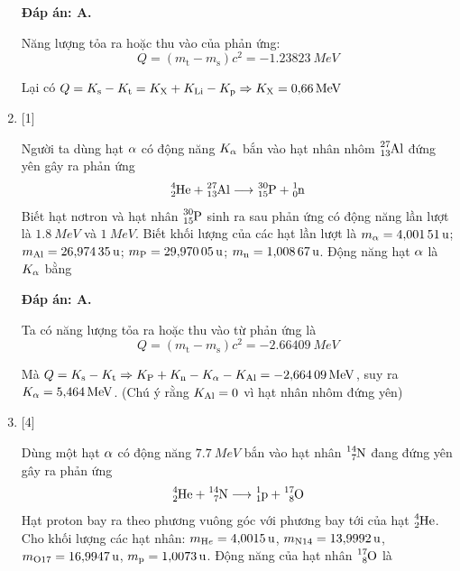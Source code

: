 \begin{enumerate}[label=\bfseries Câu \arabic*:]
	\loigiai
	{		\textbf{Đáp án: A.}
		
		Năng lượng tỏa ra hoặc thu vào của phản ứng:
	$$Q=(m_\text{t} - m_\text{s})c^2 = \SI{-1.23823}{MeV}$$
	
	Lại có $Q=K_{\text{s}} - K_{\text{t}} = K_{\ce{X}} + K_{\ce{Li}} - K_{\ce{p}} \Rightarrow K_{\ce{X}} = \SI{0.66}{MeV}$
		
	}
	\item {} [1]
	
	\cauhoi
	{Người ta dùng hạt $\ce{\alpha}$ có động năng $K_{\ce{\alpha}}$ bắn vào hạt nhân nhôm $\ce{^27_13 Al}$ đứng yên gây ra phản ứng 
		$$\ce{^4_2 He} + \ce{^27_13 Al} \longrightarrow \ce{^30_15 P} + \ce{^1_0 n}$$
		Biết hạt nơtron và hạt nhân $\ce{^30_15 P}$ sinh ra sau phản ứng có động năng lần lượt là $\SI{1.8}{MeV}$ và $\SI{1}{MeV}$. Biết khối lượng của các hạt lần lượt là $m_{\ce{\alpha}} = \SI{4.00151}{u}$; $m_{\ce{Al}} = \SI{26.97435}{u}$; $m_{\ce{P}} = \SI{29.97005}{u}$; $m_{\ce{n}} = \SI{1.00867}{u}$. Động năng hạt $\ce{\alpha}$ là $K_{\ce{\alpha}}$ bằng
	}
	
	\loigiai
	{		\textbf{Đáp án: A.}
		
		Ta có năng lượng tỏa ra hoặc thu vào từ phản ứng là
	$$Q=(m_\text{t} - m_\text{s})c^2 = \SI{-2.66409}{MeV}$$
	
	Mà $Q=K_\text{s} - K_\text{t} \Rightarrow K_{\ce{P}} + K_{\ce{n}} - K_{\ce{\alpha}} - K_{\ce{Al}} = \SI{-2.66409}{MeV}$, suy ra $K_{\ce{\alpha}} = \SI{5.464}{MeV}$. (Chú ý rằng $K_{\ce{Al}}=0$ vì hạt nhân nhôm đứng yên)
	}
	\item {} [4]
	
	\cauhoi
	{Dùng một hạt $\ce{\alpha}$ có động năng $\SI{7.7}{MeV}$ bắn vào hạt nhân $\ce{^14_7 N}$ đang đứng yên gây ra phản ứng
		$$\ce{^4_2 He} + \ce{^14_7 N} \longrightarrow \ce{^1_1 p} + \ce{^17_8 O}$$
		Hạt proton bay ra theo phương vuông góc với phương bay tới của hạt $\ce{^4_2 He}$. Cho khối lượng các hạt nhân: $m_{\ce He} = \SI{4.0015}{u}$, $m_{\ce{N 14}} = \SI{13.9992}{u}$, $m_{\ce{O 17}} = \SI{16.9947}{u}$, $m_{\ce{p}} = \SI{1.0073}{u}$. Động năng của hạt nhân $\ce{^17_8 O}$ là
	}
	

\end{enumerate}
